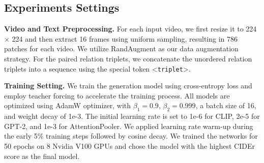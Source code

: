 \documentclass[letterpaper]{article}
\begin{document}
\subsection{Experiments Settings}
\noindent\textbf{Video and Text Preprocessing. }
For each input video, we first resize it to 224 $\times$ 224 and then extract 16 frames using uniform sampling, resulting in 786 patches for each video. We utilize RandAugment \cite{Ekin2019randaugment} as our data augmentation strategy.
For the paired relation triplets, we concatenate the unordered relation triplets into a sequence using the special token \textless\texttt{triplet}\textgreater.

\noindent\textbf{Training Setting. }
We train the generation model using cross-entropy loss and employ teacher forcing to accelerate the training process.
All models are optimized using AdamW optimizer, with $\beta_{1}=0.9$, $\beta_{2}=0.999$, a batch size of 16, and weight decay of 1e-3.
The initial learning rate is set to 1e-6 for CLIP, 2e-5 for GPT-2, and 1e-3 for AttentionPooler.
We applied learning rate warm-up during the early 5\% training steps followed by cosine decay.
We trained the networks for 50 epochs on 8 Nvidia V100 GPUs and chose the model with the highest CIDEr score as the final model.
\end{document}
